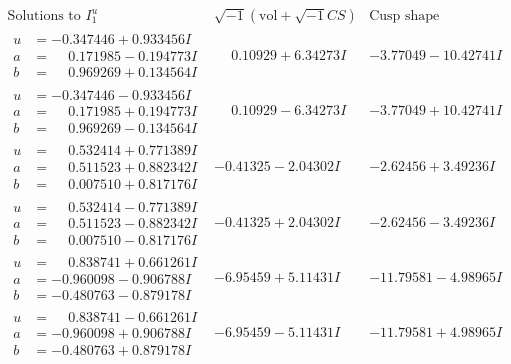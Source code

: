 \documentclass[1p]{elsarticle_modified}
\theoremstyle{definition}
\newcommand{\I}{\sqrt{-1}}
\begin{document}
$$\begin{array}{c|c|c}  
\text{Solutions to }I^u_{1}& \I (\text{vol} + \sqrt{-1}CS) & \text{Cusp shape}\\
 \hline 
\begin{aligned}
u &= -0.347446 + 0.933456 I \\
a &= \phantom{-}0.171985 - 0.194773 I \\
b &= \phantom{-}0.969269 + 0.134564 I\end{aligned}
 & \phantom{-}0.10929 + 6.34273 I & -3.77049 - 10.42741 I \\ \hline\begin{aligned}
u &= -0.347446 - 0.933456 I \\
a &= \phantom{-}0.171985 + 0.194773 I \\
b &= \phantom{-}0.969269 - 0.134564 I\end{aligned}
 & \phantom{-}0.10929 - 6.34273 I & -3.77049 + 10.42741 I \\ \hline\begin{aligned}
u &= \phantom{-}0.532414 + 0.771389 I \\
a &= \phantom{-}0.511523 + 0.882342 I \\
b &= \phantom{-}0.007510 + 0.817176 I\end{aligned}
 & -0.41325 - 2.04302 I & -2.62456 + 3.49236 I \\ \hline\begin{aligned}
u &= \phantom{-}0.532414 - 0.771389 I \\
a &= \phantom{-}0.511523 - 0.882342 I \\
b &= \phantom{-}0.007510 - 0.817176 I\end{aligned}
 & -0.41325 + 2.04302 I & -2.62456 - 3.49236 I \\ \hline\begin{aligned}
u &= \phantom{-}0.838741 + 0.661261 I \\
a &= -0.960098 - 0.906788 I \\
b &= -0.480763 - 0.879178 I\end{aligned}
 & -6.95459 + 5.11431 I & -11.79581 - 4.98965 I \\ \hline\begin{aligned}
u &= \phantom{-}0.838741 - 0.661261 I \\
a &= -0.960098 + 0.906788 I \\
b &= -0.480763 + 0.879178 I\end{aligned}
 & -6.95459 - 5.11431 I & -11.79581 + 4.98965 I \\ \hline\begin{aligned}

\end{aligned}
\end{array}$$
\end{document}
